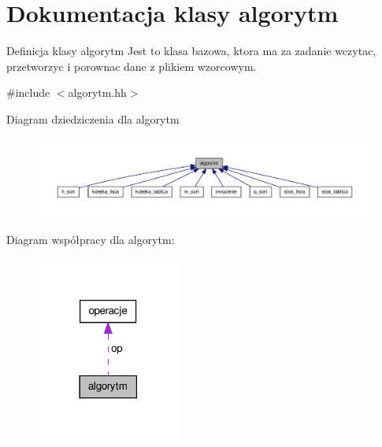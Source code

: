 \hypertarget{classalgorytm}{\section{\-Dokumentacja klasy algorytm}
\label{classalgorytm}
}


\-Definicja klasy algorytm \-Jest to klasa bazowa, ktora ma za zadanie wczytac, przetworzyc i porownac dane z plikiem wzorcowym.  




{\ttfamily \#include $<$algorytm.\-hh$>$}



\-Diagram dziedziczenia dla algorytm
\nopagebreak
\begin{figure}[H]
\begin{center}
\leavevmode
\includegraphics[width=350pt]{classalgorytm__inherit__graph}
\end{center}
\end{figure}


\-Diagram współpracy dla algorytm\-:\nopagebreak
\begin{figure}[H]
\begin{center}
\leavevmode
\includegraphics[width=134pt]{classalgorytm__coll__graph}
\end{center}
\end{figure}

